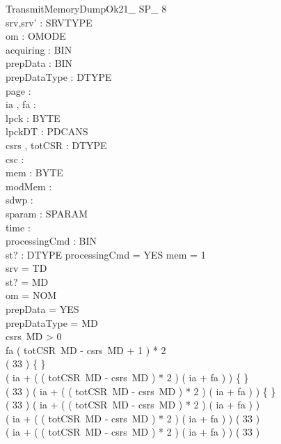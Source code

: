 \begin{schema}{TransmitMemoryDumpOk21\_ SP\_ 8}\\
 srv,srv' : SRVTYPE \\
 om : OMODE \\
 acquiring : BIN \\
 prepData : BIN \\
 prepDataType : DTYPE \\
 page : \nat \\
 ia , fa : \nat \\
 lpck : \seq BYTE \\
 lpckDT : PDCANS \\
 csrs , totCSR : DTYPE \fun \nat \\
 csc : \nat \\
 mem : \nat \pfun BYTE \\
 modMem : \power \nat \\
 sdwp : \nat \\
 sparam : SPARAM \fun \nat \\
 time : \nat \\
 processingCmd : BIN \\
 st? : DTYPE 
\where
 processingCmd = YES \land \dom mem = 1  \\
 srv = TD \\
 st? = MD \\
 om = NOM \\
 prepData = YES \\
 prepDataType = MD \\
 csrs~MD > 0 \\
 fa \leq ( totCSR~MD - csrs~MD + 1 ) * 2 \\
 ( 33  ) \neq \{ \} \\
 ( ia + ( ( totCSR~MD - csrs~MD ) * 2 ) \upto ( ia + fa ) ) \neq \{ \} \\
 ( 33  ) \cap ( ia + ( ( totCSR~MD - csrs~MD ) * 2 ) \upto ( ia + fa ) ) \neq \{ \} \\
 \lnot ( 33  ) \subseteq ( ia + ( ( totCSR~MD - csrs~MD ) * 2 ) \upto ( ia + fa ) ) \\
 \lnot ( ia + ( ( totCSR~MD - csrs~MD ) * 2 ) \upto ( ia + fa ) ) \subseteq ( 33  ) \\
 ( ia + ( ( totCSR~MD - csrs~MD ) * 2 ) \upto ( ia + fa ) ) \neq ( 33  )
\end{schema}


